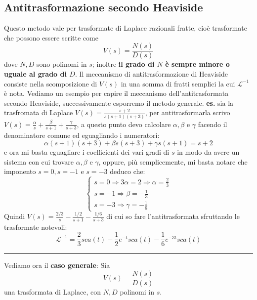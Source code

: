 \subsection{Antitrasformazione secondo Heaviside}
Questo metodo vale per trasformate di Laplace razionali fratte, cioè trasformate che possono essere scritte come
\[
    V(s) = \frac{N(s)}{D(s)}
\] dove $N, D$ sono polinomi in $s$; inoltre \textbf{il grado di $N$ è sempre minore o uguale al grado di $D$}.\newline
\newline
Il meccanismo di antitrasformazione di Heaviside consiste nella scomposizione di $V(s)$ in una somma di fratti semplici la cui $\mathcal{L}^{-1}$ è nota.\newline
\newline
Vediamo un esempio per capire il meccanismo dell'antitrasformata secondo Heaviside, successivamente esporremo il metodo generale.\newline
\newline
\textbf{es.} sia la trasfromata di Laplace $V(s) = \frac{s+2}{s(s+1)(s+3)}$, per antitrasformarla scrivo $V(s) = \frac{\alpha}{s} + \frac{\beta}{s+1} + \frac{\gamma}{s+3}$, a questo punto devo calcolare $\alpha, \beta$ e $\gamma$ facendo il denominatore comune ed eguagliando i numeratori:
\[
    \alpha(s+1)(s+3) + \beta s(s+3) + \gamma s (s+1) = s+2
\]
e ora mi basta eguagliare i coefficienti dei vari gradi di $s$ in modo da avere un sistema con cui trovare $\alpha, \beta$ e $\gamma$, oppure, più semplicemente, mi basta notare che imponento $s=0, s=-1$ e $s=-3$ deduco che:
\[
    \begin{cases}
        s=0 \Rightarrow 3 \alpha = 2 \Rightarrow  \alpha = \frac{2}{3}\\
        s = -1 \Rightarrow \beta = - \frac{1}{3}\\
        s = -3 \Rightarrow \gamma = - \frac{1}{6}
    \end{cases}
\]
Quindi $V(s) = \frac{2/3}{s} - \frac{1/2}{s+1} - \frac{1/6}{s+3}$ di cui so fare l'antitrasformata sfruttando le trasformate notevoli:
\[
    \mathcal{L}^{-1} = \frac{2}{3}sca(t) - \frac{1}{2}e^{-t}sca(t) - \frac{1}{6}e^{-3t}sca(t)
\]
\rule{\textwidth}{0,4pt}
\newline
\newline
Vediamo ora il \textbf{caso generale}:\newline
Sia
\[
    V(s) = \frac{N(s)}{D(s)}
\]
una trasformata di Laplace, con $N,D$ polinomi in $s$.\newline
\newline
